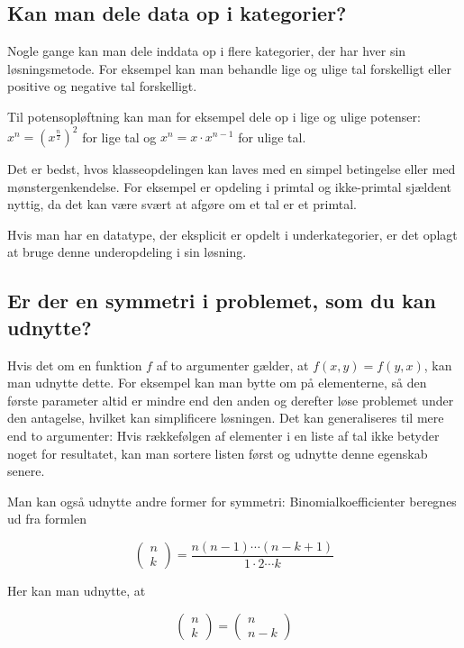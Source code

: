 \documentclass[a4paper,12pt]{article}
\begin{document}
\subsection*{Kan man dele data op i kategorier?}

Nogle gange kan man dele inddata op i flere kategorier, der har hver
sin løsningsmetode.  For eksempel kan man behandle lige og ulige tal
forskelligt eller positive og negative tal forskelligt.

Til potensopløftning kan man for eksempel dele op i lige og ulige
potenser: $x^n = (x^\frac{n}{2})^2$ for lige tal og $x^n = x\cdot
x^{n{-}1}$ for ulige tal.

Det er bedst, hvos klasseopdelingen kan laves med en simpel betingelse
eller med mønstergenkendelse.  For eksempel er opdeling i primtal og
ikke-primtal sjældent nyttig, da det kan være svært at afgøre om et
tal er et primtal.

Hvis man har en datatype, der eksplicit er opdelt i underkategorier,
er det oplagt at bruge denne underopdeling i sin løsning.

\subsection*{Er der en symmetri i problemet, som du kan udnytte?}

Hvis det om en funktion $f$ af to argumenter gælder, at $f(x,y) =
f(y,x)$, kan man udnytte dette.  For eksempel kan man bytte om på
elementerne, så den første parameter altid er mindre end den anden og
derefter løse problemet under den antagelse, hvilket kan simplificere
løsningen.  Det kan generaliseres til mere end to argumenter: Hvis
rækkefølgen af elementer i en liste af tal ikke betyder noget for
resultatet, kan man sortere listen først og udnytte denne egenskab
senere.

Man kan også udnytte andre former for symmetri: Binomialkoefficienter
beregnes ud fra formlen

\[\left ( \begin{array}{c}n \\ k\end{array} \right ) 
= \frac{n(n-1)\cdots(n-k+1)}{1\cdot2\cdots k}\]

\noindent
Her kan man udnytte, at

\[\left ( \begin{array}{c}n \\ k\end{array} \right )
 = \left ( \begin{array}{c}n \\ n-k\end{array} \right )\]
\end{document}
